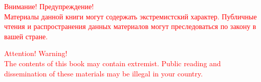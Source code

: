 \pagecolor{black}
\vspace*{\fill}
\begin{center}
\textcolor{red}{Внимание! Предупреждение!\\
Материалы данной книги могут содержать экстремистский характер. 
Публичные чтения и распространения данных материалов могут преследоваться по закону в вашей стране.}\\
\vspace*{2cm}

\textcolor{red}{Attention! Warning!\\
The contents of this book may contain extremist.
Public reading and dissemination of these materials may be illegal in your country.}
\end{center}
\vspace*{\fill}

